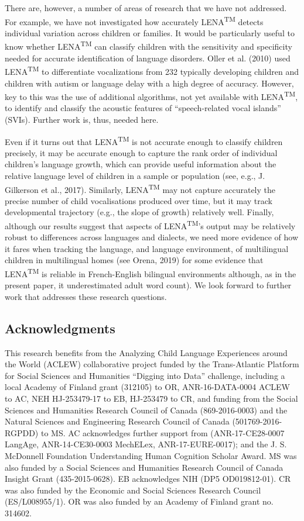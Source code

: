 \documentclass[english,floatsintext,man]{apa6}
\begin{document}
There are, however, a number of areas of research that we have not
addressed. For example, we have not investigated how accurately
LENA\textsuperscript{TM} detects individual variation across children or
families. It would be particularly useful to know whether
LENA\textsuperscript{TM} can classify children with the sensitivity and
specificity needed for accurate identification of language disorders.
Oller et al. (2010) used LENA\textsuperscript{TM} to differentiate
vocalizations from 232 typically developing children and children with
autism or language delay with a high degree of accuracy. However, key to
this was the use of additional algorithms, not yet available with
LENA\textsuperscript{TM}, to identify and classify the acoustic features
of \enquote{speech-related vocal islands} (SVIs). Further work is, thus,
needed here.

Even if it turns out that LENA\textsuperscript{TM} is not accurate
enough to classify children precisely, it may be accurate enough to
capture the rank order of individual children's language growth, which
can provide useful information about the relative language level of
children in a sample or population (see, e.g., J. Gilkerson et al.,
2017). Similarly, LENA\textsuperscript{TM} may not capture accurately
the precise number of child vocalisations produced over time, but it may
track developmental trajectory (e.g., the slope of growth) relatively
well. Finally, although our results suggest that aspects of
LENA\textsuperscript{TM}'s output may be relatively robust to
differences across languages and dialects, we need more evidence of how
it fares when tracking the language, and language environment, of
multilingual children in multilingual homes (see Orena, 2019) for some
evidence that LENA\textsuperscript{TM} is reliable in French-English
bilingual environments although, as in the present paper, it
underestimated adult word count). We look forward to further work that
addresses these research questions.

\subsection{Acknowledgments}\label{acknowledgments}

This research benefits from the Analyzing Child Language Experiences
around the World (ACLEW) collaborative project funded by the
Trans-Atlantic Platform for Social Sciences and Humanities
\enquote{Digging into Data} challenge, including a local Academy of
Finland grant (312105) to OR, ANR-16-DATA-0004 ACLEW to AC, NEH
HJ-253479-17 to EB, HJ-253479 to CR, and funding from the Social
Sciences and Humanities Research Council of Canada (869-2016-0003) and
the Natural Sciences and Engineering Research Council of Canada
(501769-2016-RGPDD) to MS. AC acknowledges further support from
(ANR-17-CE28-0007 LangAge, ANR-14-CE30-0003 MechELex, ANR-17-EURE-0017);
and the J. S. McDonnell Foundation Understanding Human Cognition Scholar
Award. MS was also funded by a Social Sciences and Humanities Research
Council of Canada Insight Grant (435-2015-0628). EB acknowledges NIH
(DP5 OD019812-01). CR was also funded by the Economic and Social
Sciences Research Council (ES/L008955/1). OR was also funded by an
Academy of Finland grant no. 314602.
\end{document}
